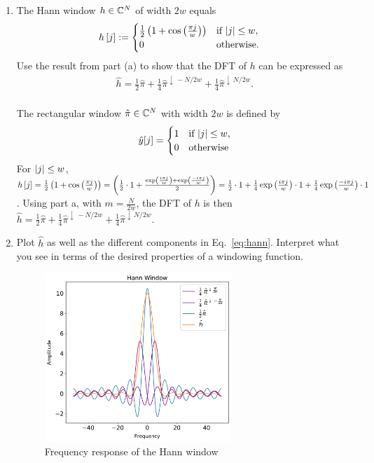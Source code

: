 \documentclass[12pt,twoside]{article}
\begin{document}
\begin{enumerate}
\begin{enumerate}
 \item The Hann window $h \in \mathbb{C}^{N}$ of width $2w$ equals
\begin{align}
h\left[ j \right] & :=  
 \begin{cases}
  \frac{1}{2} \left( 1 + \cos \left(  \frac{ \pi j}{w} \right) \right) & \text{if } \lvert j\rvert \leq w,\\
   0 & \text{otherwise.}
  \end{cases}
\end{align} 
Use the result from part (a) to show that the DFT of $h$ can be expressed as
\begin{align}
\label{eq:hann}
\hat{h} = \frac{1}{2}\hat{\pi} + \frac{1}{4}\hat{\pi}^{\downarrow \, -N/2w} + \frac{1}{4}\hat{\pi}^{\downarrow \, N/2w}.
\end{align}\\
 The rectangular window $\hat{\pi} \in  \mathbb{C}^{N}$ with width $2w$ is defined by
\begin{equation*}
  \hat{y}[j] =
    \begin{cases}
      1 & \text{if } \lvert j\rvert \leq w,\\
      0 & \text{otherwise}
    \end{cases}       
\end{equation*}
For $\lvert j\rvert \leq w$, $h\left[ j \right] =  \frac{1}{2} \left( 1 + \cos \left(  \frac{ \pi j}{w} \right) \right) =  \left( \frac{1}{2}  \cdot 1 +  \frac{ \exp \left( \frac{i \pi j}{w}  \right) 
+  \exp \left( \frac{-i \pi j}{w}  \right)} {2}  \right) = \frac{1}{2}  \cdot 1  +  \frac{1}{4}  \exp \left( \frac{i \pi j}{w}  \right) \cdot 1 + \frac{1}{4}  \exp \left( \frac{-i \pi j}{w}  \right) \cdot 1$.
Using part a, with $m= \frac{N}{2w}$, the DFT of  $h$ is then $\hat{h} = \frac{1}{2}\hat{\pi} + \frac{1}{4}\hat{\pi}^{\downarrow \, -N/2w} + \frac{1}{4}\hat{\pi}^{\downarrow \, N/2w}$.


\item Plot $\hat{h}$ as well as the different components in Eq.~\eqref{eq:hann}. Interpret what you see in terms of the desired properties of a windowing function. 
\begin{figure}[H]
		\centering
		\captionsetup{justification=centering}
		\includegraphics[width=200pt]{code/images/Hann.pdf}
		\caption{Frequency response of the Hann window}
	\end{figure}


\end{enumerate}
\end{enumerate}
\end{document}
